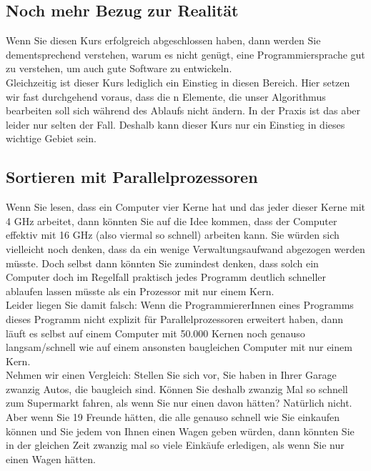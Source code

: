 \subsection{Noch mehr Bezug zur Realität}

Wenn Sie diesen Kurs erfolgreich abgeschlossen haben, dann werden Sie dementsprechend verstehen, warum es nicht genügt, eine Programmiersprache gut zu verstehen, um auch gute Software zu entwickeln.\\

Gleichzeitig ist dieser Kurs lediglich ein Einstieg in diesen Bereich. Hier setzen wir fast durchgehend voraus, dass die n Elemente, die unser Algorithmus bearbeiten soll sich während des Ablaufs nicht ändern. In der Praxis ist das aber leider nur selten der Fall. Deshalb kann dieser Kurs nur ein Einstieg in dieses wichtige Gebiet sein.

\subsection{Sortieren mit Parallelprozessoren}

Wenn Sie lesen, dass ein Computer vier Kerne hat und das jeder dieser Kerne mit 4 GHz arbeitet, dann könnten Sie auf die Idee kommen, dass der Computer effektiv mit 16 GHz (also viermal so schnell) arbeiten kann. Sie würden sich vielleicht noch denken, dass da ein wenige Verwaltungsaufwand abgezogen werden müsste. Doch selbst dann könnten Sie zumindest denken, dass solch ein Computer doch im Regelfall praktisch jedes Programm deutlich schneller ablaufen lassen müsste als ein Prozessor mit nur einem Kern.\\

Leider liegen Sie damit falsch: Wenn die ProgrammiererInnen eines Programms dieses Programm nicht explizit für Parallelprozessoren erweitert haben, dann läuft es selbst auf einem Computer mit 50.000 Kernen noch genauso langsam/schnell wie auf einem ansonsten baugleichen Computer mit nur einem Kern.\\

Nehmen wir einen Vergleich: Stellen Sie sich vor, Sie haben in Ihrer Garage zwanzig Autos, die baugleich sind. Können Sie deshalb zwanzig Mal so schnell zum Supermarkt fahren, als wenn Sie nur einen davon hätten? Natürlich nicht. Aber wenn Sie 19 Freunde hätten, die alle genauso schnell wie Sie einkaufen können und Sie jedem von Ihnen einen Wagen geben würden, dann könnten Sie in der gleichen Zeit zwanzig mal so viele Einkäufe erledigen, als wenn Sie nur einen Wagen hätten.\\

